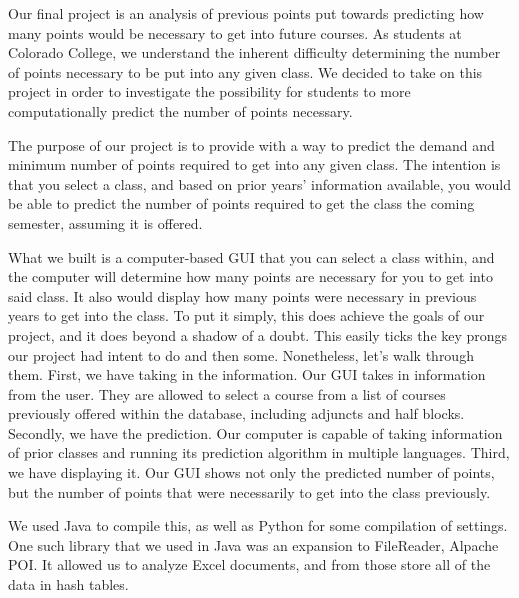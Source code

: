 

    Our final project is an analysis of previous points put towards predicting how many points would be necessary to get into future courses. As students at Colorado College, we understand the inherent difficulty determining the number of points necessary to be put into any given class. We decided to take on this project in order to investigate the possibility for students to more computationally predict the number of points necessary.


    The purpose of our project is to provide with a way to predict the demand and minimum number of points required to get into any given class. The intention is that you select a class, and based on prior years' information available, you would be able to predict the number of points required to get the class the coming semester, assuming it is offered.

    What we built is a computer-based GUI that you can select a class within, and the computer will determine how many points are necessary for you to get into said class. It also would display how many points were necessary in previous years to get into the class. To put it simply, this does achieve the goals of our project, and it does beyond a shadow of a doubt. This easily ticks the key prongs our project had intent to do and then some. Nonetheless, let's walk through them. First, we have taking in the information. Our GUI takes in information from the user. They are allowed to select a course from a list of courses previously offered within the database, including adjuncts and half blocks. Secondly, we have the prediction. Our computer is capable of taking information of prior classes and running its prediction algorithm in multiple languages. Third, we have displaying it. Our GUI shows not only the predicted number of points, but the number of points that were necessarily to get into the class previously.

    We used Java to compile this, as well as Python for some compilation of settings. One such library that we used in Java was an expansion to FileReader, Alpache POI. It allowed us to analyze Excel documents, and from those store all of the data in hash tables.
